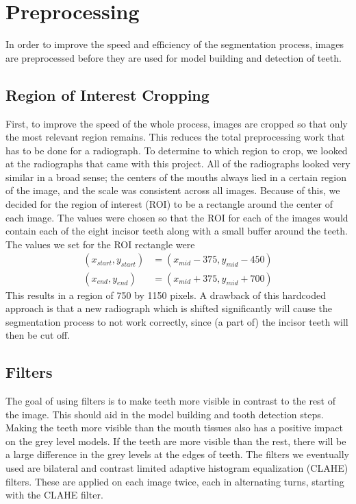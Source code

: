 \documentclass[a4paper]{article}
\begin{document}
\section{Preprocessing}
\label{sect:preprocessing}
In order to improve the speed and efficiency of the segmentation process, images are preprocessed before they are used for model building and detection of teeth.

\subsection{Region of Interest Cropping}
First, to improve the speed of the whole process, images are cropped so that only the most relevant region remains.
This reduces the total preprocessing work that has to be done for a radiograph.
To determine to which region to crop, we looked at the radiographs that came with this project.
All of the radiographs looked very similar in a broad sense; the centers of the mouths always lied in a certain region of the image, and the scale was consistent across all images.
Because of this, we decided for the region of interest (ROI) to be a rectangle around the center of each image.
The values were chosen so that the ROI for each of the images would contain each of the eight incisor teeth along with a small buffer around the teeth.
The values we set for the ROI rectangle were 
\begin{align} 
(x_{start}, y_{start}) &= (x_{mid} - 375, y_{mid} - 450) \\ 
(x_{end}, y_{end})     &= (x_{mid} + 375, y_{mid} + 700)
\end{align}
This results in a region of 750 by 1150 pixels.
A drawback of this hardcoded approach is that a new radiograph which is shifted significantly will cause the segmentation process to not work correctly, since (a part of) the incisor teeth will then be cut off.

\subsection{Filters}
The goal of using filters is to make teeth more visible in contrast to the rest of the image.
This should aid in the model building and tooth detection steps.
Making the teeth more visible than the mouth tissues also has a positive impact on the grey level models.
If the teeth are more visible than the rest, there will be a large difference in the grey levels at the edges of teeth.
The filters we eventually used are bilateral and contrast limited adaptive histogram equalization (CLAHE) filters.
These are applied on each image twice, each in alternating turns, starting with the CLAHE filter.
\bigskip 
\end{document}
